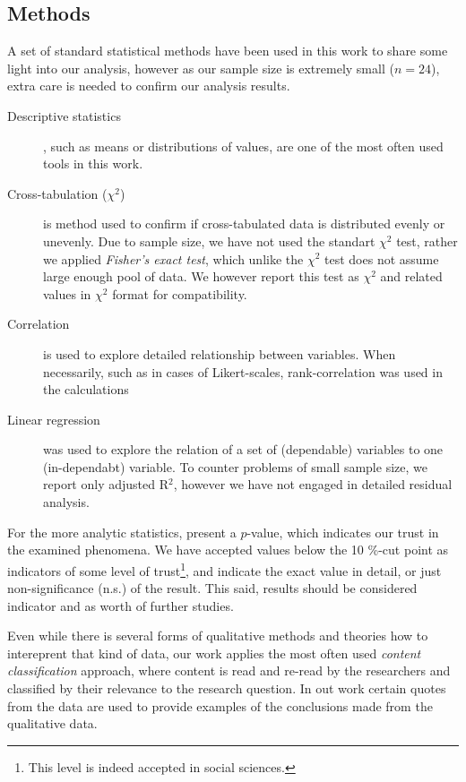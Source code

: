 \subsection{Methods}
\label{sec:methods}


A set of standard statistical methods have been used in this work to share some light into our analysis, however as our sample size is extremely small ($n=24$), extra care is needed to confirm our analysis results.

\begin{description}
\item[Descriptive statistics], such as means or distributions of values, are one of the most often used tools in this work.
\item[Cross-tabulation ($\chi^2$)] is method used to confirm if cross-tabulated data is distributed evenly or unevenly. Due to sample size, we have not used the standart $\chi^2$ test, rather we applied \textit{Fisher's exact test}, which unlike the $\chi^2$ test does not assume large enough pool of data. We however report this test as $\chi^2$ and related values in $\chi^2$ format for compatibility.
\item[Correlation] is used to explore detailed relationship between variables. When necessarily, such as in cases of Likert-scales, rank-correlation was used in the calculations
\item[Linear regression] was used to explore the relation of a set of (dependable) variables to one (in-dependabt) variable. To counter problems of small sample size, we report only adjusted R$^2$, however we have not engaged in detailed residual analysis.
\end{description}

For the more analytic statistics, present a $p$-value, which indicates our trust in the examined phenomena. We have accepted values below the 10 \%-cut point as indicators of some level of trust\footnote{This level is indeed accepted in social sciences.}, and indicate the exact value in detail, or just non-significance (n.s.) of the result. This said, results should be considered indicator and as worth of further studies.


Even while there is several forms of qualitative methods and theories how to intereprent that kind of data, our work applies the most often used \textit{content classification} approach, where content is read and re-read by the researchers and classified by their relevance to the research question. In out work certain quotes from the data are used to provide examples of the conclusions made from the qualitative data.